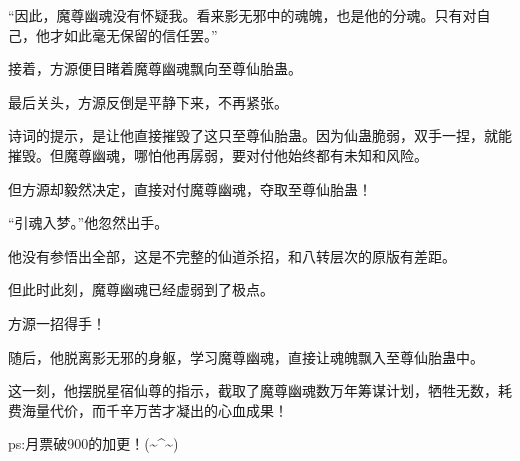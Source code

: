 \begin{this_body}
“因此，魔尊幽魂没有怀疑我。看来影无邪中的魂魄，也是他的分魂。只有对自己，他才如此毫无保留的信任罢。”

接着，方源便目睹着魔尊幽魂飘向至尊仙胎蛊。

最后关头，方源反倒是平静下来，不再紧张。

诗词的提示，是让他直接摧毁了这只至尊仙胎蛊。因为仙蛊脆弱，双手一捏，就能摧毁。但魔尊幽魂，哪怕他再孱弱，要对付他始终都有未知和风险。

但方源却毅然决定，直接对付魔尊幽魂，夺取至尊仙胎蛊！

“引魂入梦。”他忽然出手。

他没有参悟出全部，这是不完整的仙道杀招，和八转层次的原版有差距。

但此时此刻，魔尊幽魂已经虚弱到了极点。

方源一招得手！

随后，他脱离影无邪的身躯，学习魔尊幽魂，直接让魂魄飘入至尊仙胎蛊中。

这一刻，他摆脱星宿仙尊的指示，截取了魔尊幽魂数万年筹谋计划，牺牲无数，耗费海量代价，而千辛万苦才凝出的心血成果！

ps:月票破900的加更！(\~{}\^{}\~{})

\end{this_body}

